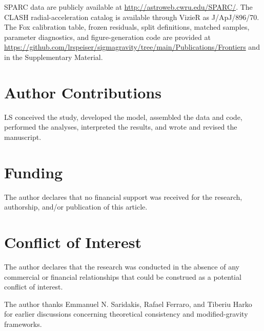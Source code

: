 \documentclass[aps,prd,reprint,superscriptaddress,showpacs,floatfix,longbibliography]{revtex4-2}
\begin{document}
SPARC data are publicly available at \url{http://astroweb.cwru.edu/SPARC/}. The CLASH radial-acceleration catalog is available through VizieR as J/ApJ/896/70. The Fox calibration table, frozen residuals, split definitions, matched samples, parameter diagnostics, and figure-generation code are provided at \url{https://github.com/lrspeiser/sigmagravity/tree/main/Publications/Frontiers} and in the Supplementary Material.

\section{Author Contributions}

LS conceived the study, developed the model, assembled the data and code, performed the analyses, interpreted the results, and wrote and revised the manuscript.

\section{Funding}

The author declares that no financial support was received for the research, authorship, and/or publication of this article.

\section{Conflict of Interest}

The author declares that the research was conducted in the absence of any commercial or financial relationships that could be construed as a potential conflict of interest.

\begin{acknowledgments}
The author thanks Emmanuel N. Saridakis, Rafael Ferraro, and Tiberiu Harko for earlier discussions concerning theoretical consistency and modified-gravity frameworks.
\end{acknowledgments}
\end{document}
